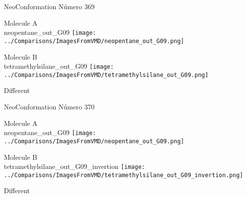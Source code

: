 \vtab[-3cm]
\begin{center}
{\large NeoConformation \tab Número 369}
\end{center}
\begin{multicols}{2}
\begin{center}
Molecule A \\ 
neopentane\_out\_G09
\texttt{[image: ../Comparisons/ImagesFromVMD/neopentane\_out\_G09.png]}
\\
\vtab

\columnbreak
Molecule B \\ 
tetramethylsilane\_out\_G09
\texttt{[image: ../Comparisons/ImagesFromVMD/tetramethylsilane\_out\_G09.png]}
\\
\vtab


\end{center}
\end{multicols}
\begin{center}
\textcolor{NavyBlue}{\Large Different}
\end{center}

 \newpage

\vtab[-3cm]
\begin{center}
{\large NeoConformation \tab Número 370}
\end{center}
\begin{multicols}{2}
\begin{center}
Molecule A \\ 
neopentane\_out\_G09
\texttt{[image: ../Comparisons/ImagesFromVMD/neopentane\_out\_G09.png]}
\\
\vtab

\columnbreak
Molecule B \\ 
tetramethylsilane\_out\_G09\_invertion
\texttt{[image: ../Comparisons/ImagesFromVMD/tetramethylsilane\_out\_G09\_invertion.png]}
\\
\vtab


\end{center}
\end{multicols}
\begin{center}
\textcolor{NavyBlue}{\Large Different}
\end{center}

 \newpage

